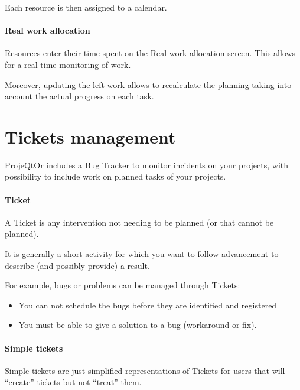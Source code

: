 \documentclass[letterpaper,10pt,english]{sphinxmanual}
\begin{document}
Each resource is then assigned to a calendar.

\paragraph{Real work allocation}

Resources enter their time spent on the Real work allocation screen. This allows for a real-time monitoring of work.

Moreover, updating the left work allows to recalculate the planning taking into account the actual progress on each task.
\newpage
{}

\section{Tickets management}
\label{Features:index-14}\label{Features:tickets-management}
ProjeQtOr includes a Bug Tracker to monitor incidents on your projects, with possibility to include work on planned tasks of your projects.

\paragraph{Ticket}

A Ticket is any intervention not needing to be planned (or that cannot be planned).

It is generally a short activity for which you want to follow advancement to describe (and possibly provide) a result.

For example, bugs or problems can be managed through Tickets:
\begin{itemize}
\item {} 
You can not schedule the bugs before they are identified and registered

\item {} 
You must be able to give a solution to a bug (workaround or fix).

\end{itemize}

\paragraph{Simple tickets}

Simple tickets are just simplified representations of Tickets for users that will ``create'' tickets but not ``treat'' them.
\end{document}
